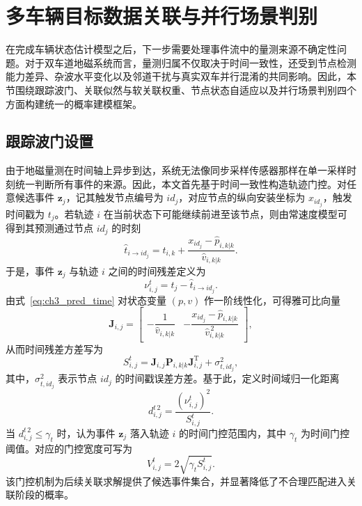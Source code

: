 \documentclass{xdupgthesis}
\begin{document}
\section{多车辆目标数据关联与并行场景判别}
\label{sec:ch3_association}

在完成车辆状态估计模型之后，下一步需要处理事件流中的量测来源不确定性问题。对于双车道地磁系统而言，量测归属不仅取决于时间一致性，还受到节点检测能力差异、杂波水平变化以及邻道干扰与真实双车并行混淆的共同影响。因此，本节围绕跟踪波门、关联似然与软关联权重、节点状态自适应以及并行场景判别四个方面构建统一的概率建模框架。

\subsection{跟踪波门设置}

由于地磁量测在时间轴上异步到达，系统无法像同步采样传感器那样在单一采样时刻统一判断所有事件的来源。因此，本文首先基于时间一致性构造轨迹门控。对任意候选事件 $\mathbf z_j$，记其触发节点编号为 $id_j$，对应节点的纵向安装坐标为 $x_{id_j}$，触发时间戳为 $t_j$。若轨迹 $i$ 在当前状态下可能继续前进至该节点，则由常速度模型可得到其预测通过节点 $id_j$ 的时刻
\begin{equation}
	\hat t_{i\rightarrow id_j}
	=
	t_{i,k}+\frac{x_{id_j}-\hat p_{i,k|k}}{\hat v_{i,k|k}}.
	\label{eq:ch3_pred_time}
\end{equation}
于是，事件 $\mathbf z_j$ 与轨迹 $i$ 之间的时间残差定义为
\begin{equation}
	\nu^{t}_{i,j}=t_j-\hat t_{i\rightarrow id_j}.
	\label{eq:ch3_time_residual}
\end{equation}
由式~\eqref{eq:ch3_pred_time} 对状态变量 $(p,v)$ 作一阶线性化，可得雅可比向量
\begin{equation}
	\mathbf J_{i,j}
	=
	\begin{bmatrix}
		-\dfrac{1}{\hat v_{i,k|k}} & -\dfrac{x_{id_j}-\hat p_{i,k|k}}{\hat v_{i,k|k}^{\,2}}
	\end{bmatrix},
	\label{eq:ch3_time_jacobian}
\end{equation}
从而时间残差方差写为
\begin{equation}
	S^{t}_{i,j}=\mathbf J_{i,j}\mathbf P_{i,k|k}\mathbf J_{i,j}^{\mathrm T}+\sigma_{t,id_j}^{2},
	\label{eq:ch3_time_var}
\end{equation}
其中，$\sigma_{t,id_j}^{2}$ 表示节点 $id_j$ 的时间戳误差方差。基于此，定义时间域归一化距离
\begin{equation}
	d^{t\,2}_{i,j}=\frac{\left(\nu^{t}_{i,j}\right)^2}{S^{t}_{i,j}}.
	\label{eq:ch3_time_maha}
\end{equation}
当 $d^{t\,2}_{i,j}\le \gamma_t$ 时，认为事件 $\mathbf z_j$ 落入轨迹 $i$ 的时间门控范围内，其中 $\gamma_t$ 为时间门控阈值。对应的门控宽度可写为
\begin{equation}
	V^{t}_{i,j}=2\sqrt{\gamma_t S^{t}_{i,j}}.
	\label{eq:ch3_gate_width_time}
\end{equation}
该门控机制为后续关联求解提供了候选事件集合，并显著降低了不合理匹配进入关联阶段的概率。
\end{document}
